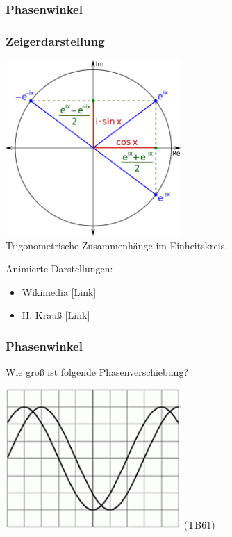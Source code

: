 \subsubsection{Phasenwinkel}

\begin{frame}
    \frametitle{Zeigerdarstellung}

    \begin{center}
        \includegraphics[width=0.5\textwidth]{a11/Sine_Cosine_Exponential_qtl1.png}
        \tiny \hyperlink{refs}{\cite{wc}}\\
        \normalsize Trigonometrische Zusammenhänge im Einheitskreis.
    \end{center}

    Animierte Darstellungen:
    \begin{itemize}
        \item Wikimedia [\href{http://commons.wikimedia.org/wiki/File:Einheitskreis_mit_Sinus_und_Kosinusfunktion.gif}{Link}]
        \item H. Krauß [\href{http://www.hutschdorf.de/flash/sinus.htm}{Link}]
    \end{itemize}

\end{frame}

\begin{frame}
    \frametitle{Phasenwinkel}

    \begin{block}{
        Wie groß ist folgende Phasenverschiebung?
        \begin{center}
            \includegraphics[width=0.5\textwidth]{a11/TB612.png}
            \tiny (TB61)
        \end{center}
    }
    \end{block}


\end{frame}

